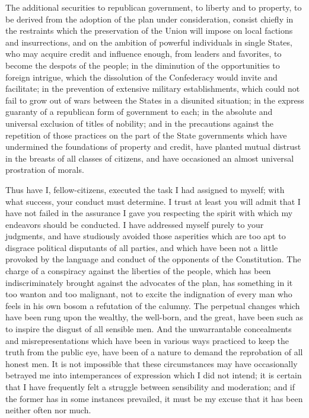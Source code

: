 The additional securities to republican government, to liberty and to property, to be derived from the adoption of the plan under consideration, consist chiefly in the restraints which the preservation of the Union will impose on local factions and insurrections, and on the ambition of powerful individuals in single States, who may acquire credit and influence enough, from leaders and favorites, to become the despots of the people; in the diminution of the opportunities to foreign intrigue, which the dissolution of the Confederacy would invite and facilitate; in the prevention of extensive military establishments, which could not fail to grow out of wars between the States in a disunited situation; in the express guaranty of a republican form of government to each; in the absolute and universal exclusion of titles of nobility; and in the precautions against the repetition of those practices on the part of the State governments which have undermined the foundations of property and credit, have planted mutual distrust in the breasts of all classes of citizens, and have occasioned an almost universal prostration of morals.

Thus have I, fellow-citizens, executed the task I had assigned to myself; with what success, your conduct must determine. I trust at least you will admit that I have not failed in the assurance I gave you respecting the spirit with which my endeavors should be conducted. I have addressed myself purely to your judgments, and have studiously avoided those asperities which are too apt to disgrace political disputants of all parties, and which have been not a little provoked by the language and conduct of the opponents of the Constitution. The charge of a conspiracy against the liberties of the people, which has been indiscriminately brought against the advocates of the plan, has something in it too wanton and too malignant, not to excite the indignation of every man who feels in his own bosom a refutation of the calumny. The perpetual changes which have been rung upon the wealthy, the well-born, and the great, have been such as to inspire the disgust of all sensible men. And the unwarrantable concealments and misrepresentations which have been in various ways practiced to keep the truth from the public eye, have been of a nature to demand the reprobation of all honest men. It is not impossible that these circumstances may have occasionally betrayed me into intemperances of expression which I did not intend; it is certain that I have frequently felt a struggle between sensibility and moderation; and if the former has in some instances prevailed, it must be my excuse that it has been neither often nor much.

